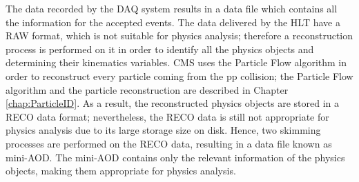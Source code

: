 \noindent The data recorded by the DAQ system results in a data file which contains all the information for
the accepted events. The data delivered by the HLT have a RAW format, which is not
suitable for physics analysis; therefore a reconstruction process is performed on it in 
order to identify all the physics objects and determining their kinematics variables. CMS uses 
the Particle Flow algorithm in order to reconstruct every particle coming from the pp collision; the 
Particle Flow algorithm and the particle reconstruction are described 
in Chapter \ref{chap:ParticleID}. As a result, the reconstructed physics objects are stored in a RECO data 
format; nevertheless, the RECO data is still not appropriate for physics analysis due to its large 
storage size on disk. Hence, two skimming processes are performed on the RECO data, resulting in 
a data file known as mini-AOD. The mini-AOD contains only the relevant information 
of the physics objects, making them appropriate for physics analysis. \\


















